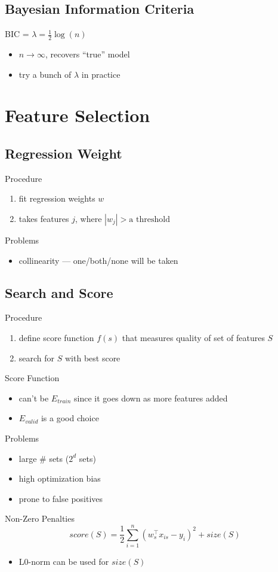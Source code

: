 \documentclass[10pt,landscape,a4paper]{article}
\begin{document}
\begin{multicols*}{5}
\subsection{Bayesian Information Criteria}
BIC = \(\lambda = \frac{1}{2} \log(n)\)
\begin{itemize}
    \item \(n \rightarrow \infty \), recovers ``true'' model
    \item try a bunch of \(\lambda \) in practice
\end{itemize}

\section{Feature Selection}

\subsection{Regression Weight}
Procedure
\begin{enumerate}
    \item fit regression weights \(w\)
    \item takes features \(j\), where \(|w_j| > \text{a threshold }\)
\end{enumerate}
Problems
\begin{itemize}
    \item collinearity --- one/both/none will be taken
\end{itemize}

\subsection{Search and Score}
Procedure
\begin{enumerate}
    \item define score function \(f(s)\) that measures quality of set of features \(S\)
    \item search for \(S\) with best score
\end{enumerate}
Score Function
\begin{itemize}
    \item can't be \(E_{train}\) since it goes down as more features added
    \item \(E_{valid}\) is a good choice
\end{itemize}
Problems
\begin{itemize}
    \item large \# sets (\(2^d\) sets)
    \item high optimization bias
    \item prone to false positives
\end{itemize}
Non-Zero Penalties
\begin{dmath*}
    score(S) = \frac{1}{2} \sum_{i=1}^{n} (w_s^\intercal x_{is} - y_i)^2 + size(S)
\end{dmath*}
\begin{itemize}
    \item L0-norm can be used for \(size(S)\)
\end{itemize}


\end{multicols*}
\end{document}
